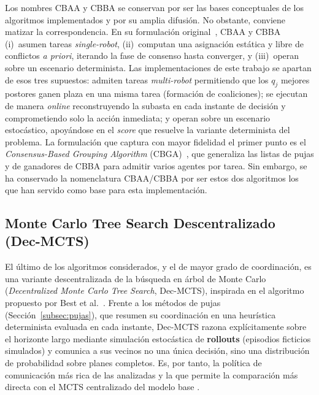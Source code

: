 Los nombres CBAA y CBBA se conservan por ser las bases conceptuales de los algoritmos implementados y por su amplia difusión. No obstante, conviene matizar la correspondencia. En su formulación original~\cite{choi2009consensus}, CBAA y CBBA (i)~asumen tareas \emph{single-robot}, (ii)~computan una asignación estática y libre de conflictos \emph{a priori}, iterando la fase de consenso hasta converger, y (iii)~operan sobre un escenario determinista. Las implementaciones de este trabajo se apartan de esos tres supuestos: admiten tareas \emph{multi-robot} permitiendo que los $q_j$ mejores postores ganen plaza en una misma tarea (formación de coaliciones); se ejecutan de manera \textit{online} reconstruyendo la subasta en cada instante de decisión y comprometiendo solo la acción inmediata; y operan sobre un escenario estocástico, apoyándose en el \textit{score} que resuelve la variante determinista del problema. La formulación que captura con mayor fidelidad el primer punto es el \emph{Consensus-Based Grouping Algorithm} (CBGA)~\cite{hunt2014cbga}, que generaliza las listas de pujas y de ganadores de CBBA para admitir varios agentes por tarea. Sin embargo, se ha conservado la nomenclatura CBAA/CBBA por ser estos dos algoritmos los que han servido como base para esta implementación.




\subsection{Monte Carlo Tree Search Descentralizado (Dec-MCTS)} \label{subsec:dec-mcts}

El último de los algoritmos considerados, y el de mayor grado de coordinación, es una variante descentralizada de la búsqueda en árbol de Monte Carlo (\emph{Decentralized Monte Carlo Tree Search}, Dec-MCTS), inspirada en el algoritmo propuesto por Best et al.~\cite{best2019decmcts}. Frente a los métodos de pujas (Sección~\ref{subsec:pujas}), que resumen su coordinación en una heurística determinista evaluada en cada instante, Dec-MCTS razona explícitamente sobre el horizonte largo mediante simulación estocástica de \textbf{rollouts} (episodios ficticios simulados) y comunica a sus vecinos no una única decisión, sino una distribución de probabilidad sobre planes completos. Es, por tanto, la política de comunicación más rica de las analizadas y la que permite la comparación más directa con el MCTS centralizado del modelo base .

